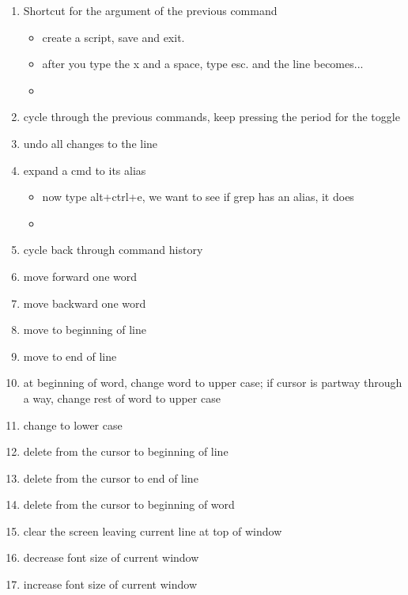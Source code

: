 \begin{enumerate}
	\item{ Shortcut for the argument of the previous command}
		\begin{itemize}
			\item {}  create a script, save and exit.
			\item {}  after you type the x and a space, type esc. and the line becomes...
			\item {}
		\end{itemize}
	\item{  cycle through the previous commands, keep pressing the period for the toggle}
	\item{  undo all changes to the line}
	\item{ expand a cmd to its alias}
			\begin{itemize}
			\item {}  now type alt+ctrl+e, we want to see if grep has an alias, it does
			\item {}
			\end{itemize}
	\item{  cycle back through command history}
	\item{  move forward one word}
	\item{  move backward one word}
	\item{  move to beginning of line}
	\item{  move to end of line}
    \item{  at beginning of word, change word to upper case; if cursor is partway through a way, change rest of word to upper case}
    \item{  change to lower case}
    \item{  delete from the cursor to beginning of line}
    \item{  delete from the cursor to end of line}
    \item{  delete from the cursor to beginning of word}
    \item{  clear the screen leaving current line at top of window}
    \item{  decrease font size of current window}
    \item{  increase font size of current window}

\end{enumerate}
